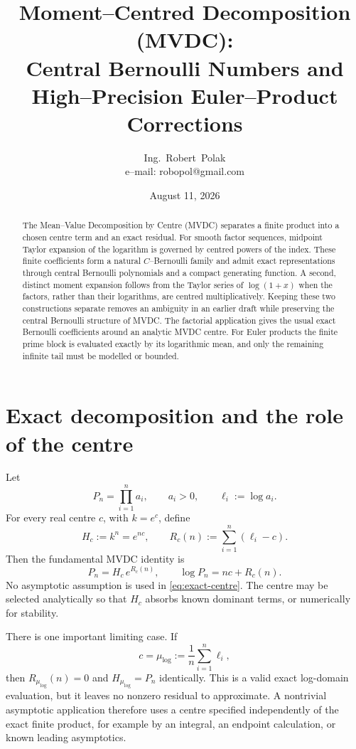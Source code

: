 \documentclass[11pt,a4paper]{article}
\title{Moment--Centred Decomposition (MVDC):\\
Central Bernoulli Numbers and High--Precision Euler--Product Corrections}
\author{Ing.~Robert~Polak\\\small e--mail: robopol@gmail.com}
\date{August 11, 2026}
\begin{document}
\maketitle

\begin{abstract}
The Mean--Value Decomposition by Centre (MVDC) separates a finite product
into a chosen centre term and an exact residual.  For smooth factor
sequences, midpoint Taylor expansion of the logarithm is governed by
centred powers of the index.  These finite coefficients form a natural
\(C\)--Bernoulli family and admit exact representations through central
Bernoulli polynomials and a compact generating function.  A second,
distinct moment expansion follows from the Taylor series of
\(\log(1+x)\) when the factors, rather than their logarithms, are centred
multiplicatively.  Keeping these two constructions separate removes an
ambiguity in an earlier draft while preserving the central Bernoulli
structure of MVDC.  The factorial application gives the usual exact
Bernoulli coefficients around an analytic MVDC centre.  For Euler
products the finite prime block is evaluated exactly by its logarithmic
mean, and only the remaining infinite tail must be modelled or bounded.
\end{abstract}

\section{Exact decomposition and the role of the centre}

Let
\[
  P_n=\prod_{i=1}^{n}a_i,\qquad a_i>0,\qquad
  \ell_i:=\log a_i .
\]
For every real centre \(c\), with \(k=e^c\), define
\[
  H_c:=k^n=e^{nc},\qquad
  R_c(n):=\sum_{i=1}^{n}(\ell_i-c).
\]
Then the fundamental MVDC identity is
\begin{equation}\label{eq:exact-centre}
  \boxed{\;P_n=H_c\,e^{R_c(n)},\qquad
  \log P_n=nc+R_c(n).\;}
\end{equation}
No asymptotic assumption is used in \eqref{eq:exact-centre}.  The centre
may be selected analytically so that \(H_c\) absorbs known dominant
terms, or numerically for stability.

There is one important limiting case.  If
\[
  c=\mu_{\log}:=\frac1n\sum_{i=1}^{n}\ell_i,
\]
then \(R_{\mu_{\log}}(n)=0\) and \(H_{\mu_{\log}}=P_n\) identically.
This is a valid exact log-domain evaluation, but it leaves no nonzero
residual to approximate.  A nontrivial asymptotic application therefore
uses a centre specified independently of the exact finite product, for
example by an integral, an endpoint calculation, or known leading
asymptotics.
\end{document}
